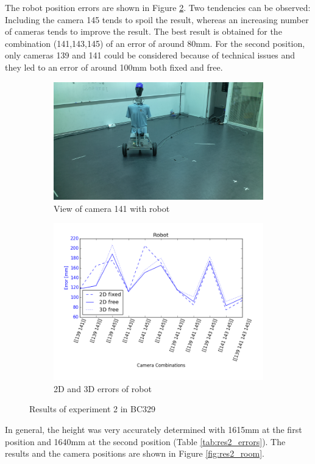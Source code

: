 The robot position errors are shown in Figure \ref{fig:res2_combi}. Two tendencies can be observed: 
Including the camera 145 tends to spoil the result, whereas an increasing number of cameras tends to improve the result. The best result is obtained for the combination (141,143,145) of an error of around 80mm.
For the second position, only cameras 139 and 141 could be considered because of technical issues and they led to an error of around 100mm both fixed and free. 
\begin{figure}[H]
    \centering
    \begin{subfigure}{0.49\linewidth}
        \centering
        \includegraphics[width=\linewidth]{files/res2_0_image_141.png}
        \caption{View of camera 141 with robot}
        \label{fig:res2_0_image_141}
    \end{subfigure}
    \begin{subfigure}{0.49\linewidth}
        \centering
        \includegraphics[width=\linewidth]{files/res2_combi_rob.png}
        \caption{2D and 3D errors of robot}
        \label{fig:res2_combi}
    \end{subfigure}
    \caption{Results of experiment 2 in BC329 }
    \label{fig:experiment1}
\end{figure}
In general, the height was very accurately determined with 1615mm at the first position and 1640mm at the second position (Table \ref{tab:res2_errors}).
The results and the camera positions are shown in Figure \ref{fig:res2_room}.

